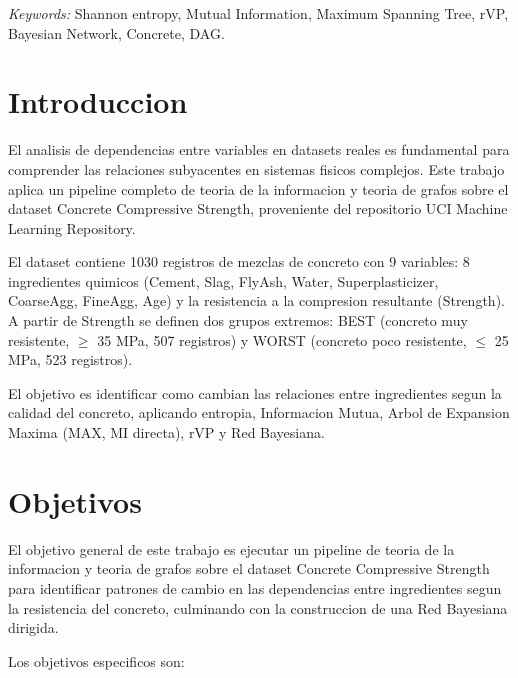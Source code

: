 \documentclass[12pt, a4paper]{article}
\begin{document}
\vspace{0.5cm}
\noindent\textit{Keywords:} Shannon entropy, Mutual Information, Maximum
Spanning Tree, rVP, Bayesian Network, Concrete, DAG.

\newpage

\section{Introduccion}
\label{sec:intro}

El analisis de dependencias entre variables en datasets reales es fundamental
para comprender las relaciones subyacentes en sistemas fisicos complejos. Este
trabajo aplica un pipeline completo de teoria de la informacion y teoria de
grafos sobre el dataset Concrete Compressive Strength, proveniente del
repositorio UCI Machine Learning Repository.

El dataset contiene 1030 registros de mezclas de concreto con 9 variables:
8 ingredientes quimicos (Cement, Slag, FlyAsh, Water, Superplasticizer,
CoarseAgg, FineAgg, Age) y la resistencia a la compresion resultante
(Strength). A partir de Strength se definen dos grupos extremos: BEST
(concreto muy resistente, $\ge$ 35 MPa, 507 registros) y WORST (concreto
poco resistente, $\le$ 25 MPa, 523 registros).

El objetivo es identificar como cambian las relaciones entre ingredientes
segun la calidad del concreto, aplicando entropia, Informacion Mutua, Arbol
de Expansion Maxima (MAX, MI directa), rVP y Red Bayesiana.

\section{Objetivos}

El objetivo general de este trabajo es ejecutar un pipeline de teoria de la
informacion y teoria de grafos sobre el dataset Concrete Compressive Strength
para identificar patrones de cambio en las dependencias entre ingredientes
segun la resistencia del concreto, culminando con la construccion de una Red
Bayesiana dirigida.

Los objetivos especificos son:
\end{document}
